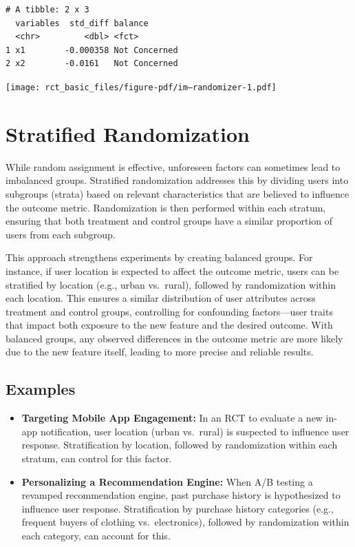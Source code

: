 \documentclass[
  letterpaper,
  DIV=11,
  numbers=noendperiod]{scrreprt}
\newenvironment{Shaded}{\begin{snugshade}}{\end{snugshade}}
\newcommand{\CommentTok}[1]{\textcolor[rgb]{0.37,0.37,0.37}{#1}}
\newcommand{\NormalTok}[1]{\textcolor[rgb]{0.00,0.23,0.31}{#1}}
\newcommand{\SpecialCharTok}[1]{\textcolor[rgb]{0.37,0.37,0.37}{#1}}
\begin{document}
\begin{verbatim}
# A tibble: 2 x 3
  variables  std_diff balance      
  <chr>         <dbl> <fct>        
1 x1        -0.000358 Not Concerned
2 x2        -0.0161   Not Concerned
\end{verbatim}

\begin{Shaded}
\end{Shaded}

\texttt{[image: rct\_basic\_files/figure-pdf/im--randomizer-1.pdf]}

\section{Stratified Randomization}\label{stratified-randomization}

While random assignment is effective, unforeseen factors can sometimes
lead to imbalanced groups. Stratified randomization addresses this by
dividing users into subgroups (strata) based on relevant characteristics
that are believed to influence the outcome metric. Randomization is then
performed within each stratum, ensuring that both treatment and control
groups have a similar proportion of users from each subgroup.

This approach strengthens experiments by creating balanced groups. For
instance, if user location is expected to affect the outcome metric,
users can be stratified by location (e.g., urban vs.~rural), followed by
randomization within each location. This ensures a similar distribution
of user attributes across treatment and control groups, controlling for
confounding factors---user traits that impact both exposure to the new
feature and the desired outcome. With balanced groups, any observed
differences in the outcome metric are more likely due to the new feature
itself, leading to more precise and reliable results.

\subsection{Examples}\label{examples}

\begin{itemize}
\item
  \textbf{Targeting Mobile App Engagement:} In an RCT to evaluate a new
  in-app notification, user location (urban vs.~rural) is suspected to
  influence user response. Stratification by location, followed by
  randomization within each stratum, can control for this factor.
\item
  \textbf{Personalizing a Recommendation Engine:} When A/B testing a
  revamped recommendation engine, past purchase history is hypothesized
  to influence user response. Stratification by purchase history
  categories (e.g., frequent buyers of clothing vs.~electronics),
  followed by randomization within each category, can account for this.
\end{itemize}
\end{document}
